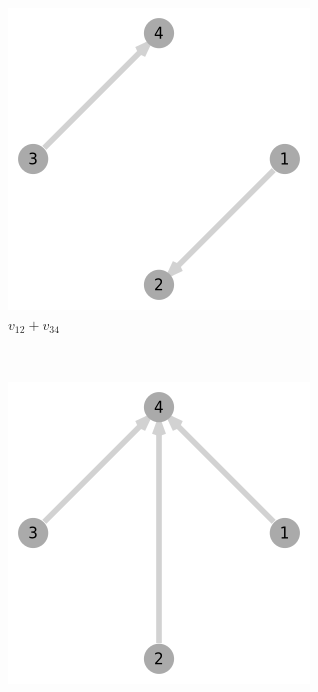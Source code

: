 \documentclass{juliacon}
\begin{document}
\begin{figure}[t]
	\centering
	\caption{Different variations of bivectors in $\mb R^4$ discrete topology.}
	\begin{subfigure}[b]{0.14\textwidth}
		\includegraphics[width=\textwidth]{img/graph-1.png}
		\caption{$v_{12}+v_{34}$}
	\end{subfigure}
	~
	\begin{subfigure}[b]{0.14\textwidth}
		\includegraphics[width=\textwidth]{img/graph-2.png}

\end{subfigure}
\end{figure}
\end{document}
